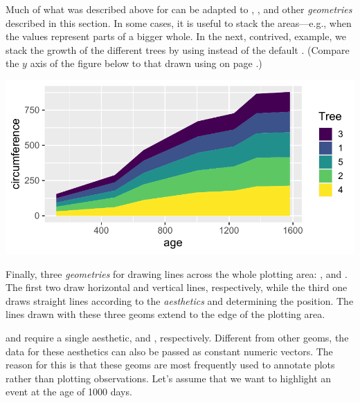 \documentclass[krantz2]{krantz}\usepackage{knitr}
\begin{document}
Much of what was described above for  can be adapted to , ,   and other \emph{geometries} described in this section. In some cases, it is useful to stack the areas---e.g.,  when the values represent parts of a bigger whole. In the next, contrived, example, we stack the growth of the different trees by using  instead of the default . (Compare the $y$ axis of the figure below to that drawn using  on page \pageref{plot:fig:lines}.)

\begin{knitrout}\footnotesize
{}\color{fgcolor}\begin{kframe}
\begin{alltt}
\hlstd{(} 
       \hlstd{(}      \hlopt{+}
  \hlstd{(} \hlstd{=} \hlstd{)}
\end{alltt}
\end{kframe}

{\centering \includegraphics[width=.7\textwidth]{figure/pos-area-plot-01-1} 

}


\end{knitrout}

Finally,\label{sec:plot:vhline} three \emph{geometries} for drawing lines across the whole plotting area: ,  and . The first two draw horizontal and vertical lines, respectively, while the third one draws straight lines according to the \emph{aesthetics}  and  determining the position. The lines drawn with these three geoms extend to the edge of the plotting area.

 and  require a single aesthetic,  and , respectively. Different from other geoms, the data for these aesthetics can also be passed as constant numeric vectors. The reason for this is that these geoms are most frequently used to annotate plots rather than plotting observations. Let's assume that we want to highlight an event at the age of 1000 days.
\end{document}
